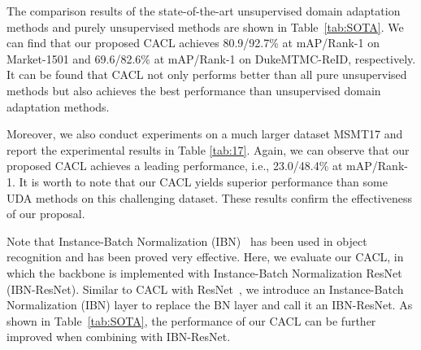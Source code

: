 \documentclass[journal]{IEEEtran}
\def\ie{i.e.}
\begin{document}
The comparison results of the state-of-the-art unsupervised domain adaptation methods and purely unsupervised methods are shown in Table~\ref{tab:SOTA}. We can find 
that our proposed CACL 
achieves 80.9/92.7\% at mAP/Rank-1 on Market-1501 and 69.6/82.6\% at mAP/Rank-1 on DukeMTMC-ReID, respectively. It can be found that CACL not only performs better than all pure unsupervised methods but also achieves the best performance than unsupervised domain adaptation methods.

Moreover, we also conduct experiments on a much larger dataset MSMT17 and report the experimental results in Table \ref{tab:17}. Again, we can observe that our proposed CACL  achieves a leading performance, \ie, 23.0/48.4\% at mAP/Rank-1. It is worth to note that our CACL yields superior performance than some UDA methods on this challenging dataset. These results confirm the effectiveness of our proposal. 


Note that Instance-Batch Normalization (IBN)~\cite{Pan:IBNResNet} has been used in object recognition and has been proved very effective. Here, we evaluate our CACL, in which the backbone is implemented with Instance-Batch Normalization ResNet (IBN-ResNet). Similar to CACL with ResNet~\cite{he:CVPR16resnet}, we introduce an Instance-Batch Normalization (IBN) layer to replace the BN layer and call it an IBN-ResNet. 
As shown in 
Table~\ref{tab:SOTA}, the performance of our CACL 
can be further improved when combining with IBN-ResNet.  
\end{document}
